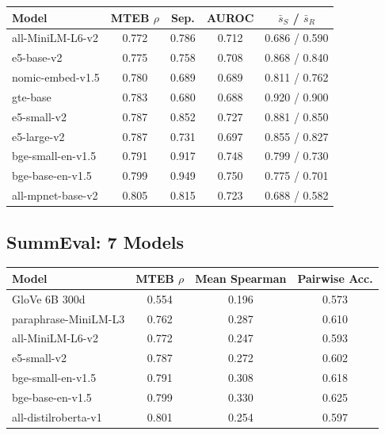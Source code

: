 \documentclass{article}
\begin{document}
\begin{center}
\small
\begin{tabular}{@{}lcccc@{}}
\toprule
\textbf{Model} & \textbf{MTEB $\rho$} & \textbf{Sep.} & \textbf{AUROC} & $\bar{s}_S$ / $\bar{s}_R$ \\
\midrule
all-MiniLM-L6-v2 & 0.772 & 0.786 & 0.712 & 0.686 / 0.590 \\
e5-base-v2 & 0.775 & 0.758 & 0.708 & 0.868 / 0.840 \\
nomic-embed-v1.5 & 0.780 & 0.689 & 0.689 & 0.811 / 0.762 \\
gte-base & 0.783 & 0.680 & 0.688 & 0.920 / 0.900 \\
e5-small-v2 & 0.787 & 0.852 & 0.727 & 0.881 / 0.850 \\
e5-large-v2 & 0.787 & 0.731 & 0.697 & 0.855 / 0.827 \\
bge-small-en-v1.5 & 0.791 & 0.917 & 0.748 & 0.799 / 0.730 \\
bge-base-en-v1.5 & 0.799 & 0.949 & 0.750 & 0.775 / 0.701 \\
all-mpnet-base-v2 & 0.805 & 0.815 & 0.723 & 0.688 / 0.582 \\
\bottomrule
\end{tabular}
\end{center}

\subsection{SummEval: 7 Models}

\begin{center}
\small
\begin{tabular}{@{}lccc@{}}
\toprule
\textbf{Model} & \textbf{MTEB $\rho$} & \textbf{Mean Spearman} & \textbf{Pairwise Acc.} \\
\midrule
GloVe 6B 300d & 0.554 & 0.196 & 0.573 \\
paraphrase-MiniLM-L3 & 0.762 & 0.287 & 0.610 \\
all-MiniLM-L6-v2 & 0.772 & 0.247 & 0.593 \\
e5-small-v2 & 0.787 & 0.272 & 0.602 \\
bge-small-en-v1.5 & 0.791 & 0.308 & 0.618 \\
bge-base-en-v1.5 & 0.799 & 0.330 & 0.625 \\
all-distilroberta-v1 & 0.801 & 0.254 & 0.597 \\
\bottomrule
\end{tabular}
\end{center}
\end{document}
